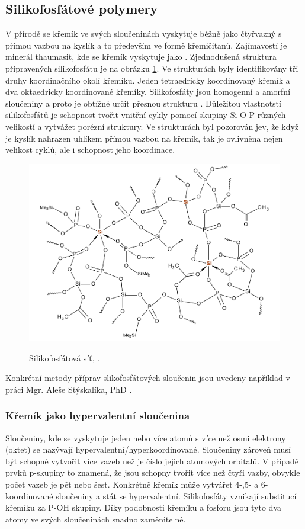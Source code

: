 \documentclass[
  digital, %
  table,   %
  lof,     %
  lot,     %
]{fithesis3}
\begin{document}
\subsection{Silikofosfátové polymery}
 V přírodě se křemík ve svých sloučeninách vyskytuje běžně jako čtyřvazný s přímou vazbou na kyslík a to především ve formě křemičitanů. Zajímavostí je minerál thaumasit, kde se křemík vyskytuje jako . Zjednodušená struktura připravených silikofosfátu je na obrázku \ref{si_polymer_cely}. Ve strukturách byly identifikovány tři druhy koordinačního okolí křemíku. Jeden tetraedricky koordinovaný křemík a dva oktaedricky koordinované křemíky. Silikofosfáty jsou homogenní a amorfní sloučeniny a proto je obtížné určit přesnou strukturu \cite{Styskalik2015thesis}. Důležitou vlastnotstí silikofosfátů je schopnost tvořit vnitřní cykly pomocí skupiny Si-O-P různých velikostí a vytvážet porézní struktury. Ve strukturách byl pozorován jev, že když je kyslík nahrazen uhlíkem přímou vazbou na křemík, tak je ovlivněna nejen velikost cyklů, ale i schopnost jeho koordinace.
\begin{figure}[h!]
\caption{Silikofosfátová síť, \cite{Styskalik2015thesis}. }
  \center
  \includegraphics[width=12cm]{si_polymer_cely.png}
  \label{si_polymer_cely}
  \end{figure}
  Konkrétní metody příprav slikofosfátových sloučenin jsou uvedeny například v práci Mgr. Aleše Stýskalíka, PhD  \cite{Styskalik2015thesis}.

\subsubsection{Křemík jako hypervalentní sloučenina}
Sloučeniny, kde se vyskytuje jeden nebo více atomů s více než osmi elektrony (oktet) se nazývají hypervalentní/hyperkoordinované. Sloučeniny zároveň musí být schopné vytvořit více vazeb než je číslo jejich atomových orbitalů. V případě prvků p-skupiny to znamená, že jsou schopny tvořit více než čtyři vazby, obvykle počet vazeb je pět nebo šest. Konkrétně křemík může vytvářet 4-,5- a 6- koordinované sloučeniny a stát se hypervalentní. Silikofosfáty vznikají substitucí křemíku za P-OH skupiny. Díky podobnosti křemíku a fosforu jsou tyto dva atomy ve svých sloučeninách snadno zaměnitelné. \\
\end{document}
